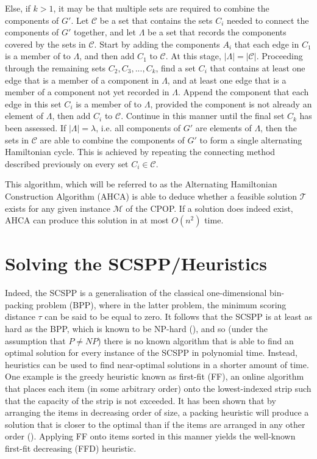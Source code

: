 \documentclass[oribibl]{llncs}
\begin{document}
Else, if $k > 1$, it may be that multiple sets are required to combine the components of $G'$. Let $\mathcal{C}$ be a set that contains the sets $C_i$ needed to connect the components of $G'$ together, and let $\Lambda$ be a set that records the components covered by the sets in $\mathcal{C}$. Start by adding the components $A_i$ that each edge in $C_1$ is a member of to $\Lambda$, and then add $C_1$ to $\mathcal{C}$. At this stage, $|\Lambda| = |\mathcal{C}|$. Proceeding through the remaining sets $C_2, C_3, ..., C_k$, find a set $C_i$ that contains at least one edge that is a member of a component in $\Lambda$, and at least one edge that is a member of a component not yet recorded in $\Lambda$. Append the component that each edge in this set $C_i$ is a member of to $\Lambda$, provided the component is not already an element of $\Lambda$, then add $C_i$ to $\mathcal{C}$. Continue in this manner until the final set $C_k$ has been assessed. If $|\Lambda| = \lambda$, i.e. all components of $G'$ are elements of $\Lambda$, then the sets in $\mathcal{C}$ are able to combine the components of $G'$ to form a single alternating Hamiltonian cycle. This is achieved by repeating the connecting method described previously on every set $C_i \in \mathcal{C}$.


This algorithm, which will be referred to as the Alternating Hamiltonian Construction Algorithm (AHCA) is able to deduce whether a feasible solution $\mathcal{T}$ exists for any given instance $\mathcal{M}$ of the CPOP. If a solution does indeed exist, AHCA can produce this solution in at most $O(n^2)$ time.

\section{Solving the SCSPP/Heuristics}
\label{sec:scsppsoln}

Indeed, the SCSPP is a generalisation of the classical one-dimensional bin-packing problem (BPP), where in the latter problem, the minimum scoring distance $\tau$ can be said to be equal to zero. It follows that the SCSPP is at least as hard as the BPP, which is known to be NP-hard (\citealp{garey1979}), and so (under the assumption that $P \neq NP$) there is no known algorithm that is able to find an optimal solution for every instance of the SCSPP in polynomial time. Instead, heuristics can be used to find near-optimal solutions in a shorter amount of time. One example is the greedy heuristic known as first-fit (FF), an online algorithm that places each item (in some arbitrary order) onto the lowest-indexed strip such that the capacity of the strip is not exceeded. It has been shown that by arranging the items in decreasing order of size, a packing heuristic will produce a solution that is closer to the optimal than if the items are arranged in any other order (\citealp{johnson1974fast}). Applying FF onto items sorted in this manner yields the well-known first-fit decreasing (FFD) heuristic.
\end{document}
